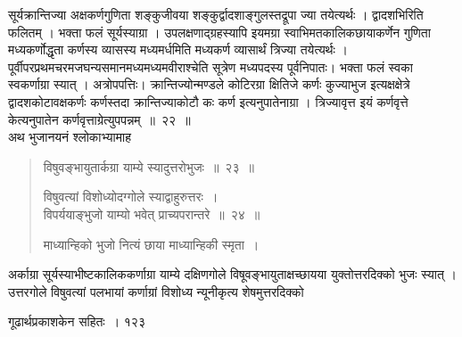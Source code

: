\documentclass[11pt, openany]{book}
\begin{document}
\begin{sloppypar}
 सूर्यक्रान्तिज्या अक्षकर्णगुणिता शङ्कुजीवया शङ्कुर्द्वादशाङ्गुलस्तद्रूपा ज्या तयेत्यर्थः । द्वादशभिरिति फलितम् । भक्ता फलं सूर्यस्याग्रा । उपलक्षणाद्ग्रहस्यापि इयमग्रा स्वाभिमतकालिकछायाकर्णेन गुणिता मध्यकर्णोद्धृता कर्णस्य व्यासस्य मध्यमर्धमिति मध्यकर्ण व्यासार्थं त्रिज्या तयेत्यर्थः । पूर्वीपरप्रथमचरमजघन्यसमानमध्यमध्यमवीराश्चेति सूत्रेण मध्यपदस्य पूर्वनिपातः। भक्ता फलं स्वका स्वकर्णाग्रा स्यात् । अत्रोपपत्तिः। क्रान्तिज्योन्मण्डले कोटिरग्रा क्षितिजे कर्णः कुज्याभुज इत्यक्षक्षेत्रे द्वादशकोटावक्षकर्णः कर्णस्तदा क्रान्तिज्याकोटौ कः कर्ण इत्यनुपातेनाग्रा । त्रिज्यावृत्त इयं कर्णवृत्ते केत्यनुपातेन कर्णवृत्ताग्रेत्युपपन्नम्~॥~२२~॥\\
 \noindent अथ भुजानयनं श्लोकाभ्यामाह\textendash
\end{sloppypar}
\begin{quote}

 {\ssi विषुवङ्भायुतार्कग्रा याम्ये स्यादुत्तरोभुजः~॥~२३~॥
 
 विषुवत्यां विशोध्योदग्गोले स्याद्वाहुरुत्तरः~।\\
 विपर्ययाङ्भुजो याम्यो भवेत् प्राच्यपरान्तरे~॥~२४~॥
 
 माध्यान्हिको भुजो नित्यं छाया माध्यान्हिकी स्मृता~।}
 \end{quote}

\begin{sloppypar}
 अर्काग्रा सूर्यस्याभीष्टकालिककर्णाग्रा याम्ये दक्षिणगोले विषूवङ्भायुताक्षच्छायया युक्तोत्तरदिक्को भुजः स्यात् । उत्तरगोले विषुवत्यां पलभायां कर्णाग्रां विशोध्य न्यूनीकृत्य शेषमुत्तरदिक्को
\end{sloppypar}

\newpage


\hspace{3cm}गूढार्थप्रकाशकेन सहितः~। \hfill १२३
\vspace{1cm}
\end{document}
